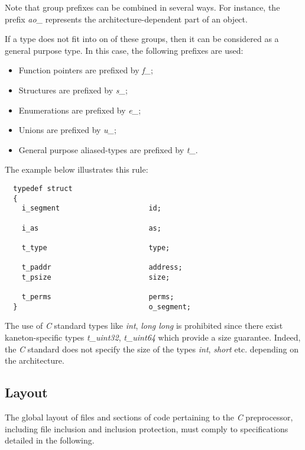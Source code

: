 Note that group prefixes can be combined in several ways. For instance,
the prefix \textit{ao\_} represents the architecture-dependent part of
an object.

If a type does not fit into on of these groups, then it can be considered as a
general purpose type. In this case, the following prefixes are used:

\begin{itemize}
  \item
    Function pointers are prefixed by \textit{f\_};
  \item
    Structures are prefixed by \textit{s\_};
  \item
    Enumerations are prefixed by \textit{e\_};
  \item
    Unions are prefixed by \textit{u\_};
  \item
    General purpose aliased-types are prefixed by \textit{t\_}.
\end{itemize}

The example below illustrates this rule:

\begin{verbatim}
  typedef struct
  {
    i_segment                     id;

    i_as                          as;

    t_type                        type;

    t_paddr                       address;
    t_psize                       size;

    t_perms                       perms;
  }                               o_segment;
\end{verbatim}

The use of \textit{C} standard types like \textit{int}, \textit{long long}
is prohibited since there exist kaneton-specific types \textit{t\_uint32},
\textit{t\_uint64} which provide a size guarantee. Indeed, the \textit{C}
standard does not specify the size of the types \textit{int}, \textit{short}
etc. depending on the architecture.

%
%

\subsection{Layout}

The global layout of files and sections of code pertaining to the \textit{C}
preprocessor, including file inclusion and inclusion protection, must
comply to specifications detailed in the following.

